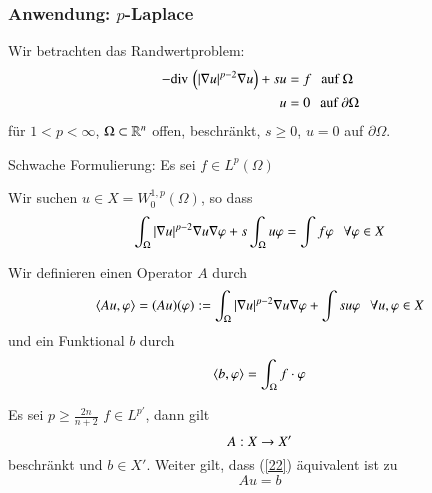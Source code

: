 \subsubsection*{Anwendung: $p$-Laplace}

Wir betrachten das Randwertproblem:
\begin{align}\label{23}
    \begin{split}
    -\mathrm{div}\,\left( |\nabla u|^{p-2} \nabla u \right) + su &=f \hspace{.25cm} \text{auf } \Omega\\
    u&=0\hspace{.25cm} \text{auf } \partial \Omega
    \end{split}
\end{align}
für $1<p<\infty$, $\Omega\subset\mathbb{R}^n$ offen, beschränkt, $s\geq 0$, $u=0$ auf $\partial\Omega$.

\noindent Schwache Formulierung: Es sei $f\in L^p (\Omega)$

Wir suchen $u\in X= W^{1,p}_0(\Omega)$, so dass
\begin{align}\label{22}
    \int_\Omega |\nabla u|^{p-2} \nabla u \nabla \varphi + s\int_{\Omega}u\varphi=\int f\varphi \hspace{.25cm} \forall \varphi \in X
\end{align}

Wir definieren einen Operator $A$ durch
\[
    \langle Au,\varphi\rangle = (Au)(\varphi) := \int_\Omega |\nabla u|^{p-2}\nabla u \nabla \varphi +\int su\varphi \hspace{.25cm} 
    \forall u,\varphi \in X
\]
und ein Funktional $b$ durch
\[
\langle b,\varphi \rangle = \int_\Omega f\cdot \varphi
\]

\begin{lem}\label{4.10}
    Es sei $p\geq \frac{2n}{n+2}$ $f\in L^{p'}$, dann gilt
    \[
        A:X\rightarrow X'
    \]
    beschränkt und $b\in X'$. Weiter gilt, dass (\ref{22}) äquivalent ist zu
    \[
        Au=b
    \]
\end{lem}

